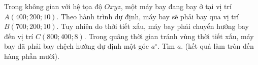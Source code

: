 \begin{ex}%
	Trong không gian với hệ tọa độ $Oxyz$, một máy bay đang bay ở tại vị trí $A(400; 200; 10)$. Theo hành trình dự định, máy bay sẽ phải bay qua vị trí $B(700; 200; 10)$. Tuy nhiên do thời tiết xấu, máy bay phải chuyển hướng bay đến vị trí $C(800; 400; 8)$. Trong quãng thời gian tránh vùng thời tiết xấu, máy bay đã phải bay chệch hướng dự định một góc $a^{\circ}$. Tìm $a$. (kết quả làm tròn đến hàng phần mười).
\end{ex}

